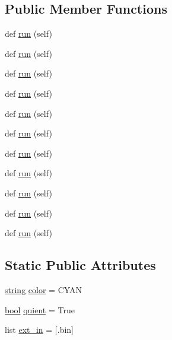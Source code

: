 \subsection*{Public Member Functions}
\begin{DoxyCompactItemize}
\item 
def \hyperlink{classwaflib_1_1_tools_1_1ccroot_1_1vnum_ad935c04b4b7adaedeedea72fdc461283}{run} (self)
\item 
def \hyperlink{classwaflib_1_1_tools_1_1ccroot_1_1vnum_ad935c04b4b7adaedeedea72fdc461283}{run} (self)
\item 
def \hyperlink{classwaflib_1_1_tools_1_1ccroot_1_1vnum_ad935c04b4b7adaedeedea72fdc461283}{run} (self)
\item 
def \hyperlink{classwaflib_1_1_tools_1_1ccroot_1_1vnum_ad935c04b4b7adaedeedea72fdc461283}{run} (self)
\item 
def \hyperlink{classwaflib_1_1_tools_1_1ccroot_1_1vnum_ad935c04b4b7adaedeedea72fdc461283}{run} (self)
\item 
def \hyperlink{classwaflib_1_1_tools_1_1ccroot_1_1vnum_ad935c04b4b7adaedeedea72fdc461283}{run} (self)
\item 
def \hyperlink{classwaflib_1_1_tools_1_1ccroot_1_1vnum_ad935c04b4b7adaedeedea72fdc461283}{run} (self)
\item 
def \hyperlink{classwaflib_1_1_tools_1_1ccroot_1_1vnum_ad935c04b4b7adaedeedea72fdc461283}{run} (self)
\item 
def \hyperlink{classwaflib_1_1_tools_1_1ccroot_1_1vnum_ad935c04b4b7adaedeedea72fdc461283}{run} (self)
\item 
def \hyperlink{classwaflib_1_1_tools_1_1ccroot_1_1vnum_ad935c04b4b7adaedeedea72fdc461283}{run} (self)
\item 
def \hyperlink{classwaflib_1_1_tools_1_1ccroot_1_1vnum_ad935c04b4b7adaedeedea72fdc461283}{run} (self)
\end{DoxyCompactItemize}
\subsection*{Static Public Attributes}
\begin{DoxyCompactItemize}
\item 
\hyperlink{test__lib_f_l_a_c_2format_8c_ab02026ad0de9fb6c1b4233deb0a00c75}{string} \hyperlink{classwaflib_1_1_tools_1_1ccroot_1_1vnum_a57f2f844f70c699cf616a56d147356bc}{color} = \textquotesingle{}C\+Y\+AN\textquotesingle{}
\item 
\hyperlink{mac_2config_2i386_2lib-src_2libsoxr_2soxr-config_8h_abb452686968e48b67397da5f97445f5b}{bool} \hyperlink{classwaflib_1_1_tools_1_1ccroot_1_1vnum_ace811c25fcaf6f27bf45dc6043611b50}{quient} = True
\item 
list \hyperlink{classwaflib_1_1_tools_1_1ccroot_1_1vnum_ab93191a4f3b22c1ceb8ceb7d2eaff68d}{ext\+\_\+in} = \mbox{[}\textquotesingle{}.bin\textquotesingle{}\mbox{]}
\end{DoxyCompactItemize}
